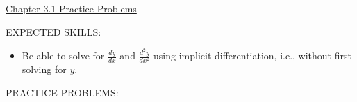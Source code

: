 \documentclass[12pt]{article}
\begin{document}
\begin{center}
\underline{\LARGE{Chapter 3.1 Practice Problems}}
\end{center}

\noindent EXPECTED SKILLS:

\begin{itemize}

\item Be able to solve for $\frac{dy}{dx}$ and $\frac{d^2y}{dx^2}$ using implicit differentiation, i.e., without first solving for $y$.

\end{itemize}

\noindent PRACTICE PROBLEMS:

\medskip

\end{document}
